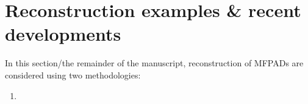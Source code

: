 \section{Reconstruction examples & recent developments}

In this section/the remainder of the manuscript, reconstruction of MFPADs are considered using two methodologies:

\begin{enumerate}
\item 
\end{enumerate}